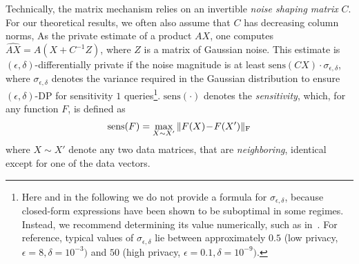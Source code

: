 Technically, the matrix mechanism relies on an invertible \emph{noise shaping matrix} $C$.
%
For our theoretical results, we often also assume that $C$ has decreasing column norms, 
%
As the private estimate of a product $AX$, one computes $\widehat{AX}=A(X+C^{-1}Z)$, where $Z$ is a matrix of \iid Gaussian noise.
%
This estimate is $(\epsilon,\delta)$-differentially private if the noise magnitude is at least $\text{sens}(CX)\cdot\sigma_{\epsilon,\delta}$,
where $\sigma_{\epsilon,\delta}$ denotes the variance required in the Gaussian distribution to ensure $(\epsilon, \delta)$-DP for sensitivity $1$ queries\footnote{Here and in the following we do not provide a formula for $\sigma_{\epsilon,\delta}$, because closed-form expressions have been shown to be suboptimal in some regimes. Instead, we recommend determining its value numerically, such as in~\citep{balle2018improving}.
%
For reference, typical values of $\sigma_{\epsilon,\delta}$ lie between approximately $0.5$ (low privacy, \eg $\epsilon=8, \delta=10^{-3})$ and $50$ (high privacy, \eg $\epsilon=0.1, \delta=10^{-9})$.}.
%
$\text{sens}(\cdot)$ denotes the \emph{sensitivity}, which, for any function $F$, is defined as
\begin{align}
\text{sens}(F)
= \max_{X\sim X'}\|F(X)\!-\!F(X')\|_{\text{F}} 
\end{align}
where $X\sim X'$ denote any two data matrices, that are \emph{neighboring}, \ie identical except for one of the data vectors.

